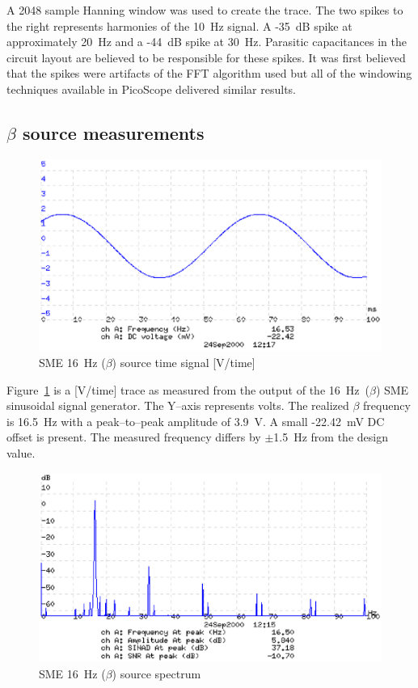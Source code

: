 A 2048 sample Hanning window was used to create the trace. The two
spikes to the right represents harmonies of the 10~Hz signal. A -35~dB
spike at approximately 20~Hz and a -44~dB spike at 30~Hz. Parasitic
capacitances in the circuit layout are believed to be responsible for
these spikes. It was first believed that the spikes were artifacts of
the FFT algorithm used but all of the windowing techniques available
in PicoScope delivered similar results.

\subsection{$\beta$ source measurements}

\begin{figure}[htbp]
\begin{center}
	\includegraphics[width=\textwidth]{SME162.ps}
    \caption{SME 16~Hz ($\beta$) source time signal [V/time]}
    \label{fig:sme16-2}
\end{center}
\end{figure}

Figure~\ref{fig:sme16-2} is a [V/time] trace as measured from the
output of the 16~Hz~($\beta$) SME sinusoidal signal generator. The
Y--axis represents volts. The realized $\beta$ frequency is 16.5~Hz
with a peak--to--peak amplitude of 3.9~V. A small -22.42~mV DC offset
is present. The measured frequency differs by $\pm$1.5~Hz from the
design value.

\begin{figure}[htbp]
\begin{center}
	\includegraphics[width=\textwidth]{SME161.ps}
    \caption{SME 16~Hz ($\beta$) source spectrum}
    \label{fig:sme16-1}
\end{center}
\end{figure}

